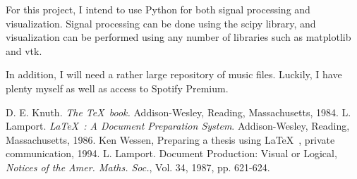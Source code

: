 \documentclass[12pt, a4paper]{article}
\begin{document}
For this project, I intend to use Python for both signal processing and
visualization. Signal processing can be done using the scipy library, and
visualization can be performed using any number of libraries such as
matplotlib and vtk.

In addition, I will need a rather large repository of music files. Luckily,
I have plenty myself as well as access to Spotify Premium.

\begin{thebibliography}{9}
 D. E. Knuth. {\em The \TeX~book.}\/ Addison-Wesley,
Reading, Massachusetts, 1984.
 L. Lamport. {\em \LaTeX~: A Document Preparation
System}.\/ Addison-Wesley, Reading, Massachusetts, 1986.
 Ken Wessen, Preparing a thesis using \LaTeX~, private
communication, 1994.
 L. Lamport. Document Production: Visual
or Logical, {\em Notices of the Amer. Maths. Soc.},\/ Vol. 34,
1987, pp. 621-624.
\end{thebibliography}
\end{document}
